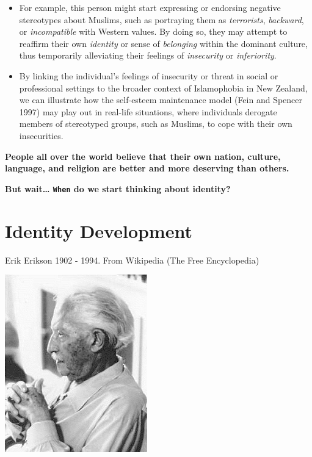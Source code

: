 \documentclass[
  ignorenonframetext,
  aspectratio=169,
]{beamer}
\providecommand{\tightlist}{%
  \setlength{\itemsep}{0pt}\setlength{\parskip}{0pt}}\usepackage{longtable,booktabs,array}
\begin{document}
\begin{frame}
\begin{itemize}[<+->]
\tightlist
\item
  For example, this person might start expressing or endorsing negative
  stereotypes about Muslims, such as portraying them as
  \emph{terrorists}, \emph{backward}, or \emph{incompatible} with
  Western values. By doing so, they may attempt to reaffirm their own
  \emph{identity} or sense of \emph{belonging} within the dominant
  culture, thus temporarily alleviating their feelings of
  \emph{insecurity} or \emph{inferiority}.
\item
  By linking the individual's feelings of insecurity or threat in social
  or professional settings to the broader context of Islamophobia in New
  Zealand, we can illustrate how the self-esteem maintenance model (Fein
  and Spencer 1997) may play out in real-life situations, where
  individuals derogate members of stereotyped groups, such as Muslims,
  to cope with their own insecurities.
\end{itemize}
\end{frame}

\begin{frame}
\textbf{People all over the world believe that their own nation,
culture, language, and religion are better and more deserving than
others.}
\end{frame}

\begin{frame}[fragile]
\textbf{But wait\ldots{} \texttt{When} do we start thinking about
identity?}
\end{frame}

\section{Identity Development}\label{identity-development}

\begin{frame}{Erik Erikson}
\label{erik-erikson}
1902 - 1994. From Wikipedia (The Free Encyclopedia)

\begin{center}
\includegraphics{figs/Erik_Erikson.jpg}
\end{center}
\end{frame}
\end{document}
